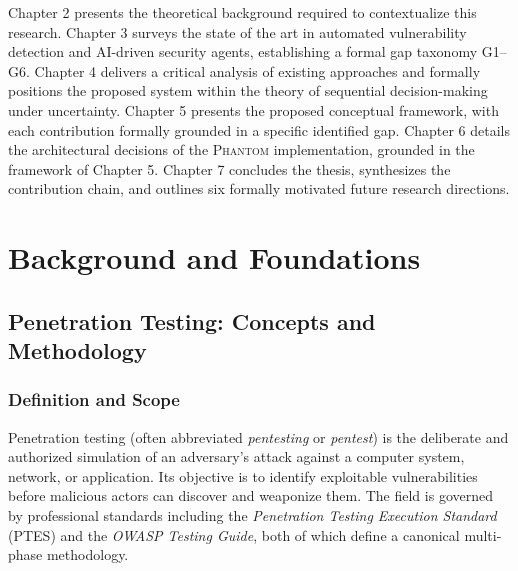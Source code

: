 \documentclass[12pt,a4paper,oneside,openany]{book}
\newcommand{\Phantom}{\textsc{Phantom}}
\newcommand{\term}[1]{\textit{#1}}
\begin{document}
Chapter 2 presents the theoretical background required to contextualize this research. Chapter 3 surveys the state of the art in automated vulnerability detection and AI-driven security agents, establishing a formal gap taxonomy G1--G6. Chapter 4 delivers a critical analysis of existing approaches and formally positions the proposed system within the theory of sequential decision-making under uncertainty. Chapter 5 presents the proposed conceptual framework, with each contribution formally grounded in a specific identified gap. Chapter 6 details the architectural decisions of the \Phantom{} implementation, grounded in the framework of Chapter 5. Chapter 7 concludes the thesis, synthesizes the contribution chain, and outlines six formally motivated future research directions.

\chapter{Background and Foundations}

\section{Penetration Testing: Concepts and Methodology}

\subsection{Definition and Scope}

Penetration testing (often abbreviated \term{pentesting} or \term{pentest}) is the deliberate and authorized simulation of an adversary's attack against a computer system, network, or application. Its objective is to identify exploitable vulnerabilities before malicious actors can discover and weaponize them. The field is governed by professional standards including the \term{Penetration Testing Execution Standard} (PTES) and the \term{OWASP Testing Guide}, both of which define a canonical multi-phase methodology.
\end{document}
